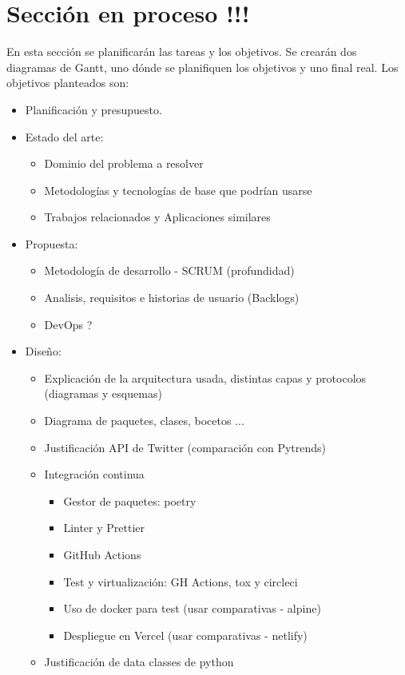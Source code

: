 \section{Sección en proceso !!!}
En esta sección se planificarán las tareas y los objetivos. Se crearán dos diagramas de Gantt, uno dónde se planifiquen los objetivos y uno final real. Los objetivos planteados son:
\begin{itemize}
\item Planificación y presupuesto.
\item Estado del arte:
\begin{itemize}
    \item Dominio del problema a resolver
    \item Metodologías y tecnologías de base que podrían usarse
    \item Trabajos relacionados y Aplicaciones similares
\end{itemize}
\item Propuesta:
\begin{itemize}
    \item Metodología de desarrollo - SCRUM (profundidad)
    \item Analisis, requisitos e historias de usuario (Backlogs)
    \item DevOps ?
\end{itemize}
\item Diseño:
\begin{itemize}
    \item Explicación de la arquitectura usada, distintas capas y protocolos (diagramas y esquemas)
    \item Diagrama de paquetes, clases, bocetos ...
    \item Justificación API de Twitter (comparación con Pytrends)
    \item Integración continua
    \begin{itemize}
        \item Gestor de paquetes: poetry
        \item Linter y Prettier
        \item GitHub Actions
        \item Test y virtualización: GH Actions, tox y circleci
        \item Uso de docker para test (usar comparativas - alpine)
        \item Despliegue en Vercel (usar comparativas - netlify)
    \end{itemize}
    \item Justificación de data classes de python

\end{itemize}
\end{itemize}
